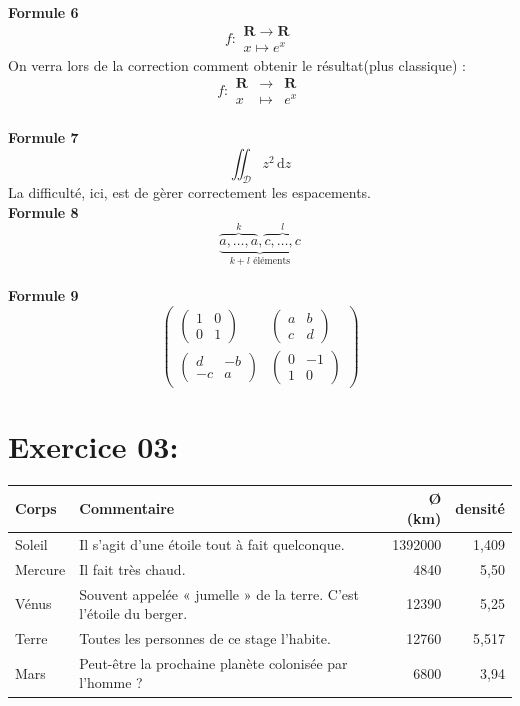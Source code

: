 \documentclass[16pt]{article}
\begin{document}
\medskip
\textbf{Formule 6}\[ f : \begin{array}{c} \mathbf{R}\to\mathbf{R} \\ x\mapsto e^x \end{array} \]
On verra lors de la correction comment obtenir le résultat(plus classique) :\[ f : \begin{array}{rcl} \mathbf{R} & \to & \mathbf{R} \\
                          x & \mapsto & e^x \end{array} \]\\
\textbf{Formule 7}
\[ \iint_{\mathcal{D}} z^2\,\mathrm{d}z \]
La difficulté, ici, est de gèrer correctement les espacements.\\
\textbf{Formule 8}
\[ \underbrace{\overbrace{a,\ldots,a}^{k},\overbrace{c,\ldots,c}^{l}}_{k+l\text{ éléments}} \]\\
\textbf{Formule 9}
\[
\begin{pmatrix}
  \begin{pmatrix} 1 & 0 \\ 0 & 1 \end{pmatrix} &
  \begin{pmatrix} a & b \\ c & d \end{pmatrix} \\
  \begin{pmatrix} d & -b \\ -c & a \end{pmatrix} &
  \begin{pmatrix} 0 & -1 \\ 1 & 0 \end{pmatrix}
\end{pmatrix}
\]

\section*{Exercice 03:}

\begin{center}
\begin{tabular}{|l|p{4cm}|r|r|}
\hline
\textbf{Corps} & \textbf{Commentaire} & \textbf{Ø (km)} & \textbf{densité} \\
\hline
Soleil & Il s'agit d'une étoile tout à fait quelconque. & 1392000 & 1,409 \\
\hline
Mercure & Il fait très chaud. & 4840 & 5,50 \\
\hline
Vénus & Souvent appelée « jumelle » de la terre. C'est l'étoile du berger. & 12390 & 5,25 \\
\hline
Terre & Toutes les personnes de ce stage l'habite. & 12760 & 5,517 \\
\hline
Mars & Peut-être la prochaine planète colonisée par l'homme ? & 6800 & 3,94 \\
\hline
\end{tabular}
\end{center}
\end{document}
